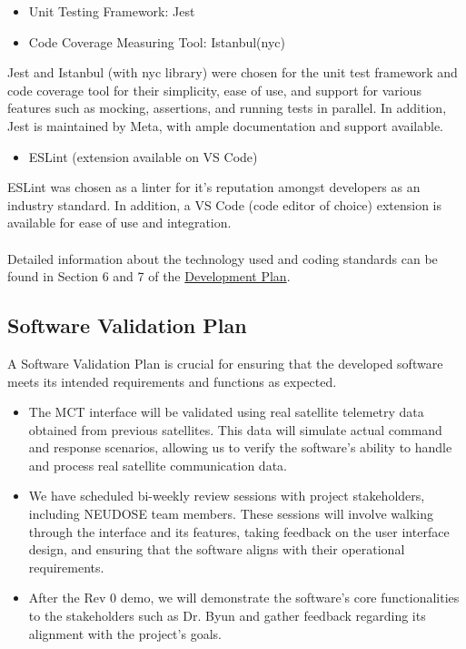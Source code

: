\documentclass[12pt, titlepage]{article}
\begin{document}
\begin{itemize}
\item Unit Testing Framework: Jest
\item Code Coverage Measuring Tool: Istanbul(nyc)
\end{itemize}
Jest and Istanbul (with nyc library) were chosen for the unit test framework and code coverage tool for their simplicity, ease of use, and support for various features such as mocking, assertions, and running tests in parallel. In addition, Jest is maintained by Meta, with ample documentation and support available.

\begin{itemize}
\item ESLint (extension available on VS Code)
\end{itemize}
ESLint was chosen as a linter for it’s reputation amongst developers as an industry standard. In addition, a VS Code (code editor of choice) extension is available for ease of use and integration.
\\ \\
Detailed information about the technology used and coding standards can be found in Section 6 and 7 of the \href{https://github.com/RishiVaya/Lower_Earth_Orbiters/blob/main/docs/DevelopmentPlan/Development_Plan.pdf}{Development Plan}.

\subsection{Software Validation Plan}

A Software Validation Plan is crucial for ensuring that the developed software meets its intended requirements and functions as expected. 
\begin{itemize}
    \item The MCT interface will be validated using real satellite telemetry data obtained from previous satellites. This data will simulate actual command and response scenarios, allowing us to verify the software's ability to handle and process real satellite communication data.
    \item We have scheduled bi-weekly review sessions with project stakeholders, including NEUDOSE team members. These sessions will involve walking through the interface and its features, taking feedback on the user interface design, and ensuring that the software aligns with their operational requirements.
    \item After the Rev 0 demo, we will demonstrate the software's core functionalities to the stakeholders such as Dr. Byun and gather feedback regarding its alignment with the project's goals.
\end{itemize}
\end{document}
